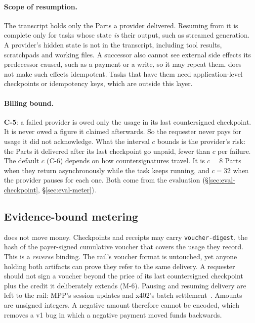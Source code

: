 \paragraph{Scope of resumption.}
The transcript holds only the Parts a provider delivered. Resuming from
it is complete only for tasks whose state \emph{is} their output, such as
streamed generation. A provider's hidden state is not in the transcript,
including tool results, scratchpads and working files. A successor also
cannot see external side effects its predecessor caused, such as a
payment or a write, so it may repeat them. \sys{} does not make such
effects idempotent. Tasks that have them need application-level
checkpoints or idempotency keys, which are outside this layer.

\paragraph{Billing bound.}
\textbf{C-5}: a failed provider is owed only the usage in its last
countersigned checkpoint. It is never owed a figure it claimed
afterwards. So the requester never pays for usage it did not
acknowledge. What the interval $c$ bounds is the provider's risk: the
Parts it delivered after its last checkpoint go unpaid, fewer than $c$
per failure. The default $c$ (C-6) depends on how countersignatures
travel. It is
$c{=}8$ Parts when they return asynchronously while the task keeps
running, and $c{=}32$ when the provider pauses for each one. Both come
from the evaluation (\S\ref{sec:eval-checkpoint},
\S\ref{sec:eval-meter}).

\subsection{Evidence-bound metering}
\label{sec:metering}
\sys{} does not move money. Checkpoints and receipts may carry
\texttt{voucher-digest}, the hash of the payer-signed cumulative voucher
that covers the usage they record. This is a \emph{reverse} binding.
The rail's voucher format is untouched, yet anyone holding both artifacts
can prove they refer to the same delivery. A requester should not sign a
voucher beyond the price of its last countersigned checkpoint plus the
credit it deliberately extends (M-6). Pausing and resuming delivery are
left to the rail: MPP's session updates and x402's batch
settlement~\cite{mpp2026,x402v2}. Amounts are unsigned integers. A
negative amount therefore cannot be encoded, which removes a v1 bug in
which a negative payment moved funds backwards.

